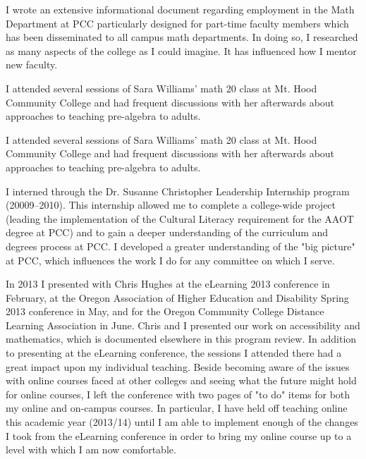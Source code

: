 \begin{description}[style=nextline]
	I wrote an extensive informational document regarding employment in the Math
	Department at PCC particularly designed for part-time faculty members which has
	been disseminated to all campus math departments. In doing so, I researched as
	many aspects of the college as I could imagine. It has influenced how I mentor
	new faculty.

\item[Jeff Lacks (Temporary Full-time Instructor, Sylvania Campus)]
	I attended several sessions of Sara Williams' math 20 class at Mt. Hood
	Community College and had frequent discussions with her afterwards about
	approaches to teaching pre-algebra to adults.

	I attended several sessions of Sara Williams' math 20 class at Mt. Hood
	Community College and had frequent discussions with her afterwards about
	approaches to teaching pre-algebra to adults.

	\item[Scot Leavitt (Full-time Instructor, Sylvania Campus)]
	I interned through the Dr. Susanne Christopher Leadership Internship program
	(20009--2010).  This internship allowed me to complete a college-wide project
	(leading the implementation of the Cultural Literacy requirement for the AAOT
	degree at PCC) and to gain a deeper understanding of the curriculum and degrees
	process at PCC.  I developed a greater understanding of the "big picture" at
	PCC, which influences the work I do for any committee on which I serve.

	In 2013 I presented with Chris Hughes at the eLearning 2013 conference
	in February, at the Oregon Association of Higher Education and Disability
	Spring 2013 conference in May, and for the Oregon Community College Distance
	Learning Association in June.  Chris and I presented our work on accessibility
	and mathematics, which is documented elsewhere in this program review.  In
	addition to presenting at the eLearning conference, the sessions I attended
	there had a great impact upon my individual teaching.  Beside becoming aware of
	the issues with online courses faced at other colleges and seeing what the
	future might hold for online courses, I left the conference with two pages of
	"to do" items for both my online and on-campus courses.  In particular, I have
	held off teaching online this academic year (2013/14) until I am able to
	implement enough of the changes I took from the eLearning conference in order
	to bring my online course up to a level with which I am now comfortable.


\end{description}

